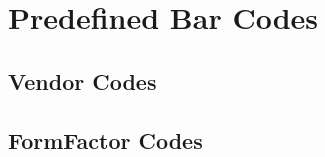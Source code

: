 \documentclass[11pt
  , a4paper
  , article
  , oneside
  , showtrims
]{memoir}
\begin{document}



\newpage
\chapter{Predefined Bar Codes}
\section{Vendor Codes}
\vspace{1cm}


\newpage
\section{FormFactor Codes}
\vspace{1cm}



\end{document}
